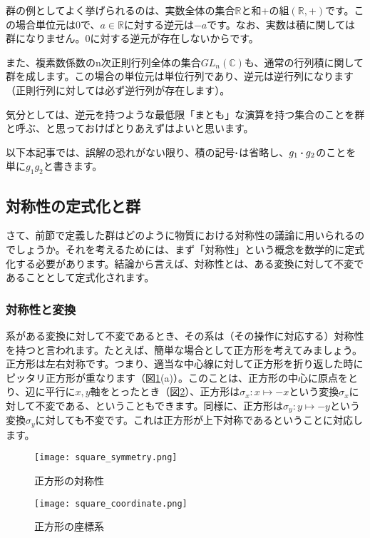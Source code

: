 \documentclass[uplatex,dvipdfmx,a4j]{jsarticle}
\begin{document}
群の例としてよく挙げられるのは、実数全体の集合$\mathbb{R}$と和$+$の組$(\mathbb{R}, +)$です。この場合単位元は0で、$a\in \mathbb{R}$に対する逆元は$-a$です。なお、実数は積に関しては群になりません。0に対する逆元が存在しないからです。

また、複素数係数のn次正則行列全体の集合$GL_n(\mathbb{C})$も、通常の行列積に関して群を成します。この場合の単位元は単位行列であり、逆元は逆行列になります（正則行列に対しては必ず逆行列が存在します）。

気分としては、逆元を持つような最低限「まとも」な演算を持つ集合のことを群と呼ぶ、と思っておけばとりあえずはよいと思います。

以下本記事では、誤解の恐れがない限り、積の記号$\vdot$は省略し、$g_1\vdot g_2$のことを単に$g_1g_2$と書きます。

\subsection{対称性の定式化と群}
さて、前節で定義した群はどのように物質における対称性の議論に用いられるのでしょうか。それを考えるためには、まず「対称性」という概念を数学的に定式化する必要があります。結論から言えば、対称性とは、ある変換に対して不変であることとして定式化されます。

\subsubsection{対称性と変換}
系がある変換に対して不変であるとき、その系は（その操作に対応する）対称性を持つと言われます。たとえば、簡単な場合として正方形を考えてみましょう。正方形は左右対称です。つまり、適当な中心線に対して正方形を折り返した時にピッタリ正方形が重なります（図\ref{fig:square_symmetry}(a)）。このことは、正方形の中心に原点をとり、辺に平行に$x,y$軸をとったとき（図\ref{fig:square_coordinate}）、正方形は$\sigma_x:x\mapsto -x$という変換$\sigma_x$に対して不変である、ということもできます。同様に、正方形は$\sigma_y:y\mapsto -y$という変換$\sigma_y$に対しても不変です。これは正方形が上下対称であるということに対応します。

\begin{figure}[htbp]
	\centering
	\texttt{[image: square\_symmetry.png]}
	\caption{正方形の対称性}
	\label{fig:square_symmetry}
\end{figure}

\begin{figure}[htbp]
	\centering
	\texttt{[image: square\_coordinate.png]}
	\caption{正方形の座標系}
	\label{fig:square_coordinate}
\end{figure}
\end{document}
